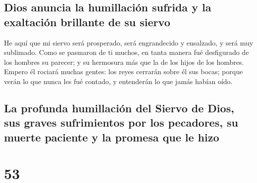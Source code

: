 \hypertarget{dios-anuncia-la-humillaciuxf3n-sufrida-y-la-exaltaciuxf3n-brillante-de-su-siervo}{%
\subsection{Dios anuncia la humillación sufrida y la exaltación
brillante de su
siervo}\label{dios-anuncia-la-humillaciuxf3n-sufrida-y-la-exaltaciuxf3n-brillante-de-su-siervo}}

 He aquí que mi siervo será prosperado, será engrandecido y
ensalzado, y será muy sublimado.  Como se pasmaron de ti
muchos, en tanta manera fué desfigurado de los hombres su parecer; y su
hermosura más que la de los hijos de los hombres.  Empero
él rociará muchas gentes: los reyes cerrarán sobre él sus bocas; porque
verán lo que nunca les fué contado, y entenderán lo que jamás habían
oído.

\hypertarget{la-profunda-humillaciuxf3n-del-siervo-de-dios-sus-graves-sufrimientos-por-los-pecadores-su-muerte-paciente-y-la-promesa-que-le-hizo}{%
\subsection{La profunda humillación del Siervo de Dios, sus graves
sufrimientos por los pecadores, su muerte paciente y la promesa que le
hizo}\label{la-profunda-humillaciuxf3n-del-siervo-de-dios-sus-graves-sufrimientos-por-los-pecadores-su-muerte-paciente-y-la-promesa-que-le-hizo}}

\hypertarget{section-52}{%
\section{53}\label{section-52}}

